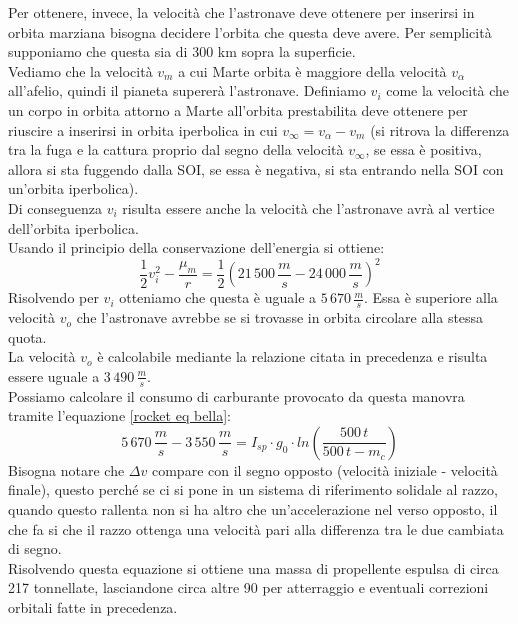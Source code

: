 Per ottenere, invece, la velocità che l'astronave deve ottenere per inserirsi in orbita marziana bisogna decidere l'orbita che questa deve avere. Per semplicità supponiamo che questa sia di 300 km sopra la superficie.\\
Vediamo che la velocità $v_m$ a cui Marte orbita è maggiore della velocità $v_\alpha$ all'afelio, quindi il pianeta supererà l'astronave. Definiamo $v_i$ come la velocità che un corpo in orbita attorno a Marte all'orbita prestabilita deve ottenere per riuscire a inserirsi in orbita iperbolica in cui $v_\infty = v_\alpha - v_m$ (si ritrova la differenza tra la fuga e la cattura proprio dal segno della velocità $v_\infty$, se essa è positiva, allora si sta fuggendo dalla SOI, se essa è negativa, si sta entrando nella SOI con un'orbita iperbolica).\\
Di conseguenza $v_i$ risulta essere anche la velocità che l'astronave avrà al vertice dell'orbita iperbolica.\\
Usando il principio della conservazione dell'energia si ottiene:
$$
\frac{1}{2}v_i^2 - \frac{\mu_m}{r} = \frac{1}{2}\left(21\,500\,\frac{m}{s} - 24\,000\,\frac{m}{s}\right)^2
$$
Risolvendo per $v_i$ otteniamo che questa è uguale a $5\,670\,\frac{m}{s}$. Essa è superiore alla velocità $v_o$ che l'astronave avrebbe se si trovasse in orbita circolare alla stessa quota.\\
La velocità $v_o$ è calcolabile mediante la relazione citata in precedenza e risulta essere uguale a $3\,490\,\frac{m}{s}$.\\
Possiamo calcolare il consumo di carburante provocato da questa manovra tramite l'equazione \ref{rocket eq bella}:
$$
5\,670\,\frac{m}{s}-3\,550\,\frac{m}{s} = I_{sp} \cdot g_0 \cdot ln\left(\frac{500\,t}{500\,t - m_c}\right)
$$
Bisogna notare che $\Delta v$ compare con il segno opposto (velocità iniziale - velocità finale), questo perché se ci si pone in un sistema di riferimento solidale al razzo, quando questo rallenta non si ha altro che un'accelerazione nel verso opposto, il che fa si che il razzo ottenga una velocità pari alla differenza tra le due cambiata di segno.\\
Risolvendo questa equazione si ottiene una massa di propellente espulsa di circa 217 tonnellate, lasciandone circa altre 90 per atterraggio e eventuali correzioni orbitali fatte in precedenza.
